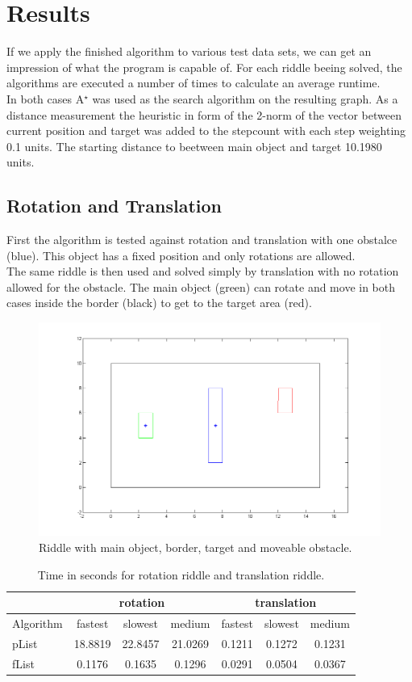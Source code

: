 \chapter{Results}
If we apply the finished algorithm to various test data sets, we can get an impression of what the program is capable of.
For each riddle beeing solved, the algorithms are executed a number of times to calculate an average runtime.\\
In both cases A$^\star$ was used as the search algorithm on the resulting graph. As a distance measurement the heuristic in form of the 2-norm of the vector between current position and target was added to the stepcount with each step weighting 0.1 units. The starting distance to beetween main object and target 10.1980 units.
\section{Rotation and Translation}
First the algorithm is tested against rotation and translation with one obstalce (blue). This object has a fixed position and only rotations are allowed.\\
The same riddle is then used and solved simply by translation with no rotation allowed for the obstacle. The main object (green) can rotate and move in both cases inside the border (black) to get to the target area (red).

\begin{figure}[H]
\includegraphics[scale = 0.5]{rotRiddle.png}
\centering
\caption{Riddle with main object, border, target and moveable obstacle.}
\end{figure}
\begin{table}
\centering
\begin{tabular}{l||c|c|c||c|c|c}
& \multicolumn{3}{c||}{rotation} &\multicolumn{3}{c}{translation}\\\hline\hline
Algorithm& fastest & slowest & medium & fastest & slowest & medium\\\hline
pList &  18.8819 & 22.8457  & 21.0269 &  0.1211& 0.1272  & 0.1231\\
fList  & 0.1176&0.1635  &0.1296  & 0.0291 & 0.0504 & 0.0367 \\
\end{tabular}
\caption{Time in seconds for rotation riddle and translation riddle.}
\end{table}

